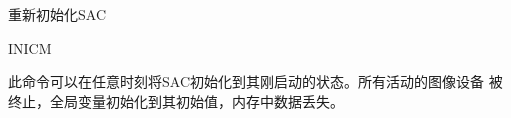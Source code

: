 \label{cmd:inicm}

重新初始化SAC

\begin{SACSTX}
INICM
\end{SACSTX}

此命令可以在任意时刻将SAC初始化到其刚启动的状态。所有活动的图像设备
被终止，全局变量初始化到其初始值，内存中数据丢失。

